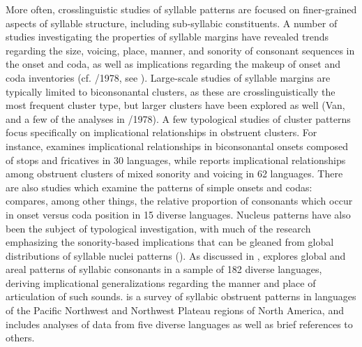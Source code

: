   More often, crosslinguistic studies of syllable patterns are focused on finer-grained aspects of syllable structure, including sub-syllabic constituents. A number of studies investigating the properties of syllable margins have revealed trends regarding the size, voicing, place, manner, and sonority of consonant sequences in the onset and coda, as well as implications regarding the makeup of onset and coda inventories (cf. \citealt{Greenberg1965}/1978, see ). Large-scale studies of syllable margins are typically limited to biconsonantal clusters, as these are crosslinguistically the most frequent cluster type, but larger clusters have been explored as well (Van\citealt{Dam2004}, and a few of the analyses in \citealt{Greenberg1965}/1978). A few typological studies of cluster patterns focus specifically on implicational relationships in obstruent clusters. For instance, \citet{Morelli1999,Morelli2003} examines implicational relationships in biconsonantal onsets composed of stops and fricatives in 30 languages, while \citet{Kreitman2008} reports implicational relationships among obstruent clusters of mixed sonority and voicing in 62 languages. There are also studies which examine the patterns of simple onsets and codas: \citet{Rousset2004} compares, among other things, the relative proportion of consonants which occur in onset versus coda position in 15 diverse languages. Nucleus patterns have also been the subject of typological investigation, with much of the research emphasizing the sonority-based implications that can be gleaned from global distributions of syllable nuclei patterns (\citealt{Blevins1995,Zec2007}). As discussed in , \citet{Bell1978a} explores global and areal patterns of syllabic consonants in a sample of 182 diverse languages, deriving implicational generalizations regarding the manner and place of articulation of such sounds. \citet{Hoard1978} is a survey of syllabic obstruent patterns in languages of the Pacific Northwest and Northwest Plateau regions of North America, and includes analyses of data from five diverse languages as well as brief references to others.

